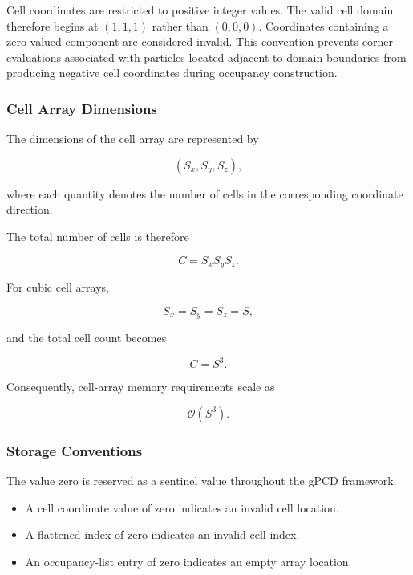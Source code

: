Cell coordinates are restricted to positive integer values. The valid
cell domain therefore begins at $(1,1,1)$ rather than $(0,0,0)$.
Coordinates containing a zero-valued component are considered invalid.
This convention prevents corner evaluations associated with particles
located adjacent to domain boundaries from producing negative cell
coordinates during occupancy construction.

\subsubsection{Cell Array Dimensions}

The dimensions of the cell array are represented by

\begin{equation}
(S_x,S_y,S_z),
\end{equation}

where each quantity denotes the number of cells in the corresponding
coordinate direction.

The total number of cells is therefore

\begin{equation}
C = S_x S_y S_z.
\end{equation}

For cubic cell arrays,

\begin{equation}
S_x = S_y = S_z = S,
\end{equation}

and the total cell count becomes

\begin{equation}
C = S^3.
\end{equation}

Consequently, cell-array memory requirements scale as

\begin{equation}
\mathcal{O}(S^3).
\end{equation}

\subsubsection{Storage Conventions}

The value zero is reserved as a sentinel value throughout the gPCD
framework.

\begin{itemize}
\item A cell coordinate value of zero indicates an invalid cell location.
\item A flattened index of zero indicates an invalid cell index.
\item An occupancy-list entry of zero indicates an empty array location.
\end{itemize}


